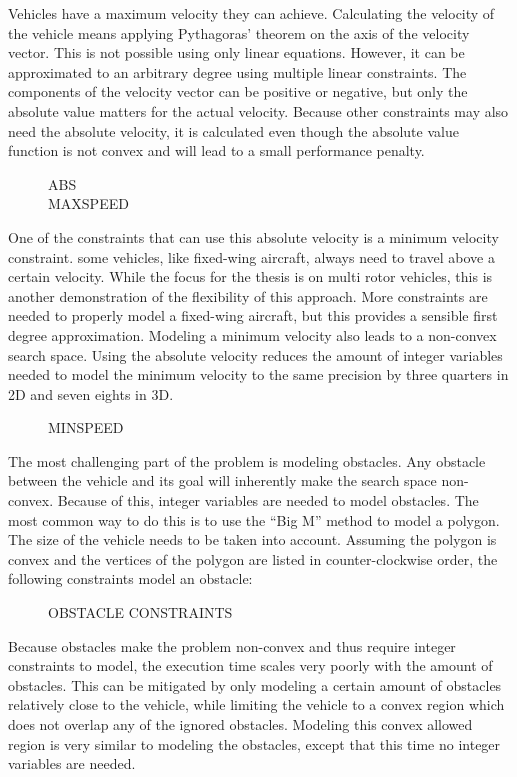 \documentclass[12pt]{article}
\begin{document}
Vehicles have a maximum velocity they can achieve. Calculating the velocity of the vehicle means applying Pythagoras' theorem on the axis of the velocity vector. This is not possible using only linear equations. However, it can be approximated to an arbitrary degree using multiple linear constraints. The components of the velocity vector can be positive or negative, but only the absolute value matters for the actual velocity. Because other constraints may also need the absolute velocity, it is calculated even though the absolute value function is not convex and will lead to a small performance penalty.
\begin{figure}[h]
ABS \\
MAXSPEED
\end{figure}
One of the constraints that can use this absolute velocity is a minimum velocity constraint. some vehicles, like fixed-wing aircraft, always need to travel above a certain velocity. While the focus for the thesis is on multi rotor vehicles, this is another demonstration of the flexibility of this approach. More constraints are needed to properly model a fixed-wing aircraft, but this provides a sensible first degree approximation. Modeling a minimum velocity also leads to a non-convex search space. Using the absolute velocity reduces the amount of integer variables needed to model the minimum velocity to the same precision by three quarters in 2D and seven eights in 3D.
\begin{figure}[h]
MINSPEED
\end{figure}

The most challenging part of the problem is modeling obstacles. Any obstacle between the vehicle and its goal will inherently make the search space non-convex. Because of this, integer variables are needed to model obstacles. The most common way to do this is to use the ``Big M'' method to model a polygon. The size of the vehicle needs to be taken into account. Assuming the polygon is convex and the vertices of the polygon are listed in counter-clockwise order, the following constraints model an obstacle:

\begin{figure}[h]
OBSTACLE CONSTRAINTS \\
\end{figure}

Because obstacles make the problem non-convex and thus require integer constraints to model, the execution time scales very poorly with the amount of obstacles. This can be mitigated by only modeling a certain amount of obstacles relatively close to the vehicle, while limiting the vehicle to a convex region which does not overlap any of the ignored obstacles. Modeling this convex allowed region is very similar to modeling the obstacles, except that this time no integer variables are needed.
\end{document}

